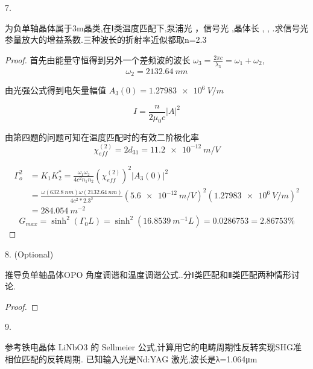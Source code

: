 \begin{exercise}

7. 

为负单轴晶体属于3m晶类,在Ⅰ类温度匹配下,泵浦光 ，信号光 ,晶体长 ,   , .求信号光参量放大的增益系数.三种波长的折射率近似都取n=2.3
\end{exercise}

\begin{proof}

首先由能量守恒得到另外一个差频波的波长 $\omega_3=\frac{2\pi c}{\lambda_3}=\omega_1+\omega_2$,
$$\omega_2= \SI{2132.64}{nm}$$

由光强公式得到电矢量幅值 $A_3(0)=\SI{1.27983e6}{V/m}$

$$
I=\frac{n}{2 \mu_0  c} |A|^{2}
$$

由第四题的问题可知在温度匹配时的有效二阶极化率
$$\chi_{eff}^{(2)}=2d_{31}=\SI{11.2e-12}{m/V}$$



$$
\begin{aligned}
\Gamma_{o}^{2}&=K_{1} K_{2}^{*}=\frac{\omega_{1} \omega_{2}}{4 c^{2} n_{1} n_{2}}\left(\chi_{e f f}^{(2)}\right)^{2}\left|A_{3}(0)\right|^{2}\\
&=\frac{ \omega \left(\SI{632.8}{nm}\right) \omega (\SI{2132.64}{nm})}{4  c^2 * 2.3^2}\left(\SI{5.6e-12}{m/V}\right)^2 \left(\SI{1.27983e6}{V/m}\right)^2\\
&=\SI{284.054}{m^{-2}}
\end{aligned}$$
$$
G_{max}=\sinh^2 (\Gamma_0 L)=\sinh^2 (\SI{16.8539}{m^{-1}} L)=0.0286753=2.86753\%$$
\end{proof}

\begin{exercise}

8. (Optional)

推导负单轴晶体OPO 角度调谐和温度调谐公式..分Ⅰ类匹配和Ⅱ类匹配两种情形讨论.
\end{exercise}

\begin{proof}

\end{proof}



\begin{exercise}

9. 

参考铁电晶体 LiNbO3 的 Sellmeier 公式,计算用它的电畴周期性反转实现SHG准相位匹配的反转周期. 已知输入光是Nd:YAG 激光,波长是λ=1.064μm
\end{exercise}

